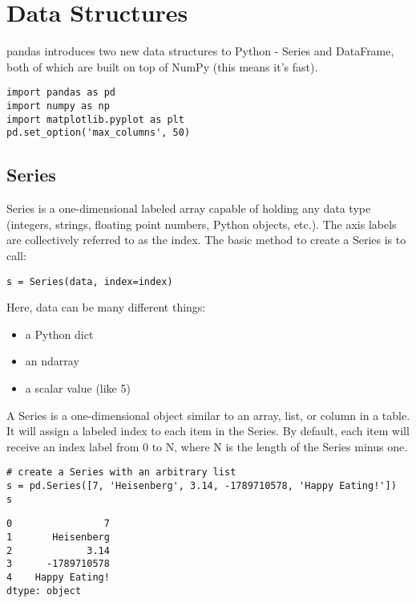 \documentclass[KSmain.tex]{subfiles}
\begin{document}
 

\section{Data Structures}

pandas introduces two new data structures to Python - Series and DataFrame, both of which are built on top of NumPy (this means it's fast).

\begin{framed}
\begin{verbatim}
import pandas as pd
import numpy as np
import matplotlib.pyplot as plt
pd.set_option('max_columns', 50)
\end{verbatim}
\end{framed}
\subsection{Series}

Series is a one-dimensional labeled array capable of holding any data type (integers, strings, floating point numbers, Python objects, etc.). The axis labels are collectively referred to as the index. The basic method to create a Series is to call:
 
\begin{framed}
\begin{verbatim}
s = Series(data, index=index)
\end{verbatim}
\end{framed} 
Here, data can be many different things:
 
\begin{itemize}
\item a Python dict
\item an ndarray
\item a scalar value (like 5)
\end{itemize}

A Series is a one-dimensional object similar to an array, list, or column in a table. It will assign a labeled index to each item in the Series. By default, each item will receive an index label from 0 to N, where N is the length of the Series minus one.

\begin{framed}
\begin{verbatim}
# create a Series with an arbitrary list
s = pd.Series([7, 'Heisenberg', 3.14, -1789710578, 'Happy Eating!'])
s
\end{verbatim}
\end{framed}
\begin{verbatim}
0                7
1       Heisenberg
2             3.14
3      -1789710578
4    Happy Eating!
dtype: object
\end{verbatim}
\end{document}
